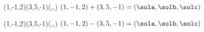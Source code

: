 \VECTORADD(1,-1,2)(3,5,-1)(\sola,\solb,\solc)
$(1,-1,2)+(3,5,-1)=(\sola,\solb,\solc)$

\VECTORSUB(1,-1,2)(3,5,-1)(\sola,\solb,\solc)
$(1,-1,2)-(3,5,-1)=(\sola,\solb,\solc)$
